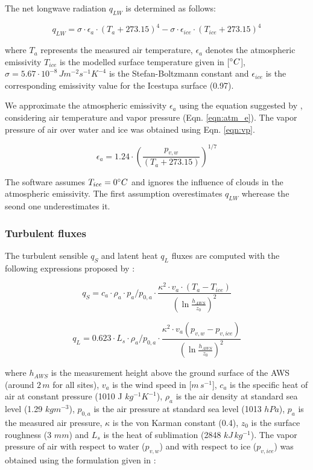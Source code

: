 \documentclass[utf8]{frontiersSCNS}
\begin{document}
The net longwave radiation $q_{LW}$ is determined as follows:

\begin{equation}
	q_{LW}= \sigma \cdot \epsilon_a \cdot {(T_a+ 273.15)}^4 -\sigma \cdot \epsilon_{ice} \cdot {(T_{ice}+ 273.15)}^4
	\label{eqn:LW}
\end{equation}

where $T_a$ represents the measured air temperature, $\epsilon_a$ denotes the atmospheric emissivity $T_{ice}$
is the modelled surface temperature given in [$\degree C$], $\sigma=5.67\cdot10^{-8}\,Jm^{-2}s^{-1}K^{-4}$ is
the Stefan-Boltzmann constant and $\epsilon_{ice}$ is the corresponding emissivity value for the Icestupa
surface (0.97).

 We approximate the atmospheric emissivity $\epsilon_a$ using the
equation suggested by \cite{Brutsaert_1975}, considering air temperature and vapor pressure (Eqn.
\ref{eqn:atm_e}). The vapor pressure of air over water and ice was obtained using Eqn. \ref{eqn:vp}.  

\begin{equation}
	\epsilon_a=1.24 \cdot (\frac{p_{v,w}}{(T_a+273.15)})^{1/7} \label{eqn:atm_e}
\end{equation}

The software assumes $T_{ice} = 0 \degree C$ and ignores the influence of clouds in the atmospheric emissivity.
The first assumption overestimates $q_{LW}$ wherease the seond one underestimates it.  

\subsubsection{Turbulent fluxes} \label{sec:Qs}

The turbulent sensible $q_{S}$ and latent heat $q_{L}$ fluxes are computed with the following expressions
proposed by \cite{Garratt_1992}:

\begin{equation}
	q_{S}= c_{a} \cdot \rho_{a} \cdot p_{a}/p_{0,a} \cdot \frac{\kappa^2 \cdot v_a \cdot
		(T_a-T_{ice})}{{(\ln{\frac{h_{AWS}}{z_{0}}})}^2}
	\label{eqn:qs}
\end{equation}

\begin{equation}
	q_{L}= 0.623 \cdot L_s \cdot \rho_{a}/p_{0,a} \cdot \frac{\kappa^2 \cdot
	v_a(p_{v,w}-p_{v,ice})}{{(\ln{\frac{h_{AWS}}{z_{0}}})}^2}
\end{equation}

where $h_{AWS}$ is the measurement height above the ground surface of the AWS (around $2\,m$ for all sites),
$v_a$ is the wind speed in [$m\,s^{-1}$], $c_a$ is the specific heat of air at constant pressure (1010 J
$kg^{-1} K^{-1}$), $\rho_{a}$ is the air density at standard sea level (1.29 $kg m^{-3}$), $p_{0,a}$ is the air
pressure at standard sea level (1013 $hPa$), $p_{a}$ is the measured air pressure, $\kappa$ is the von Karman
constant (0.4), $z_{0}$ is the surface roughness (3 $mm$) and $L_s$ is the heat of sublimation (2848
$kJ\,kg^{-1}$).  The vapor pressure of air with respect to water ($p_{v,w}$) and with respect to ice
($p_{v,ice}$) was obtained using the formulation given in \cite{huang_2018} :
\end{document}
